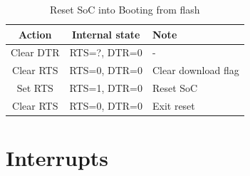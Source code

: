 \documentclass[main\_\_EN.tex]{subfiles}
\begin{document}
\begin{table}[H]
    \centering
    \caption{Reset SoC into Booting from flash}
    \label{tab:usbserialjtag-reset-soc-into-booting}
    \begin{tabular} {|c|c|l|}
    \hline
        \rowcolor{lightgray}
        \textbf{Action} & \textbf{Internal state} & \textbf{Note} \\\hline
        
        Clear DTR & RTS=?, DTR=0 & - \\\hline
        Clear RTS & RTS=0, DTR=0 &  Clear download flag \\\hline
        Set RTS & RTS=1, DTR=0 & Reset SoC \\\hline
        Clear RTS & RTS=0, DTR=0 & Exit reset \\\hline
    \end{tabular}
\end{table}


\section{Interrupts}
\end{document}
